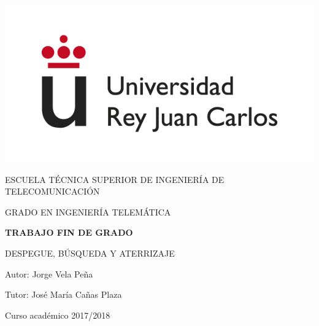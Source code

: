 \begin{titlepage}
	\begin{center}
		\vspace*{3mm}
		\begin{center}
			\includegraphics[width=0.4\linewidth]{imgs/logo.jpg}
		\end{center}
		\vspace{6.5mm}
		
		\fontsize{15.5}{14}\selectfont ESCUELA TÉCNICA SUPERIOR DE INGENIERÍA DE TELECOMUNICACIÓN
		\vspace{8mm}
		
		\fontsize{14}{14}\selectfont GRADO EN INGENIERÍA TELEMÁTICA
		
		\vspace{70pt}
		
		\fontsize{15.7}{14}\selectfont \textbf{TRABAJO FIN DE GRADO} 
		
		\vspace{25mm}
		\begin{huge}
			DESPEGUE, BÚSQUEDA Y ATERRIZAJE
		\end{huge}
		
		\vspace{25mm}
		
		\begin{large}
			Autor: Jorge Vela Peña
			
			Tutor: José María Cañas Plaza
			
			\vspace{7mm}
		\end{large}
		\begin{normalsize}
			Curso académico 2017/2018		
		\end{normalsize}
		\vspace{7mm}
		
	\end{center}
	
\end{titlepage}



